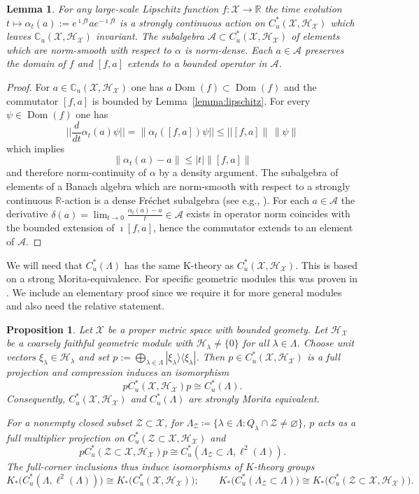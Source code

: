 \documentclass[12pt]{amsart}
\newtheorem{proposition}[theorem]{Proposition}
\newtheorem{lemma}[theorem]{Lemma}
\newcommand{\CM}{{\mathbb C}}
\newcommand{\RM}{{\mathbb R}}
\newcommand{\Aa}{{\mathcal A}}
\newcommand{\Hh}{{\mathcal H}}
\newcommand{\Xx}{{\mathcal X}}
\newcommand{\Zz}{{\mathcal Z}}
\DeclareMathOperator*{\Dom}{Dom}
\begin{document}
\begin{lemma}\label{lem:normcont}
For any large-scale Lipschitz function $f: \Xx\to \RM$ the time evolution $t \mapsto \alpha_t(a):= e^{\imath ft} a e^{-\imath ft}$ is a strongly continuous action on $C^*_u(\Xx, \Hh_\Xx)$ which leaves $\CM_u(\Xx, \Hh_\Xx)$ invariant. The subalgebra $\Aa\subset C^*_u(\Xx, \Hh_\Xx)$ of elements which are norm-smooth with respect to $\alpha$ is norm-dense. Each $a\in \Aa$ preserves the domain of $f$ and $[f, a]$ extends to a bounded operator in $\Aa$. 
\end{lemma}
\begin{proof}
For $a\in \CM_u(\Xx, \Hh_\Xx)$ one has $a\Dom(f)\subset \Dom(f)$ and the commutator $[f, a]$ is bounded by Lemma~\ref{lemma:lipschitz}. For every $\psi\in \Dom(f)$ one has 
$$
\bigg|\bigg| \frac{d}{dt} \alpha_t(a) \psi   \bigg|\bigg| = \| \alpha_t([f,a])  \psi || \leq ||[f,a]\|\, \|\psi\|
$$
which implies
$$\|\alpha_t(a)-a\|\leq |t| \|[f,a]\|$$
and therefore norm-continuity of $\alpha$ by a density argument.  The subalgebra of elements of a Banach algebra which are norm-smooth with respect to a strongly continuous $\RM$-action is a dense Fr\'echet subalgebra (see e.g., \cite{Bratteli1986}). For each $a\in \Aa$ the derivative $\delta(a)=\lim_{t\to 0} \frac{\alpha_t(a)-a}{t}\in \Aa$ exists in operator norm coincides with the bounded extension of $\imath[f, a]$, hence the commutator extends to an element of $\Aa$.
\end{proof}

We will need that $C^*_u(\Lambda)$ has the same K-theory as $C^*_u(\Xx,\Hh_\Xx)$. This is based on a strong Morita-equivalence. For specific geometric modules this was proven in
\cite[Propositions~4.7-4.8]{SpakulaWillett2013}. We include an elementary proof since we require it for more general modules and also need the relative statement.

\begin{proposition}\label{prop:morita_continuous}
Let $\Xx$ be a proper metric space with bounded geomety. Let $\Hh_\Xx$ be a coarsely faithful geometric module with $\Hh_\lambda\neq \{0\}$ for all $\lambda\in \Lambda$. Choose unit vectors $\xi_\lambda\in\Hh_\lambda$ and set $p:=\bigoplus_{\lambda\in\Lambda} |\xi_\lambda\rangle\langle\xi_\lambda|$.
Then $p\in C_u^*(\Xx,\Hh_\Xx)$ is a full projection and compression induces an
isomorphism
\[ pC_u^*(\Xx,\Hh_\Xx)p\cong C_u^*(\Lambda).\]
Consequently, $C_u^*(\Xx,\Hh_\Xx)$ and $C_u^*(\Lambda)$ are strongly Morita
equivalent.

For a nonempty closed subset $\Zz \subset \Xx$, for $\Lambda_\Zz \coloneqq \{\lambda \in \Lambda: Q_{\lambda} \cap \Zz \neq \varnothing \}$, $p$ acts as a full multiplier projection on $C^*_u(\Zz \subset \Xx, \Hh_\Xx)$ and
\[pC_u^*(\Zz\subset\Xx,\Hh_\Xx)p
 \cong C_u^*(\Lambda_\Zz\subset\Lambda, \ell^2(\Lambda)).\]
The full-corner inclusions thus induce isomorphisms of $K$-theory groups
\[K_*\bigl(C_u^*(\Lambda, \ell^2(\Lambda))\bigr)
 \cong K_*\bigl(C_u^*(\Xx,\Hh_\Xx)\bigr); \qquad  K_*\bigl(C_u^*(\Lambda_\Zz\subset\Lambda)\bigr)
 \cong K_*\bigl(C_u^*(\Zz\subset\Xx,\Hh_\Xx)\bigr).\]
\end{proposition}
\end{document}
